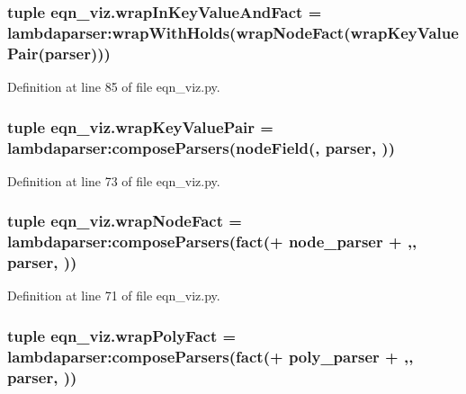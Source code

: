 \subsubsection[{wrap\+In\+Key\+Value\+And\+Fact}]{\setlength{\rightskip}{0pt plus 5cm}tuple eqn\+\_\+viz.\+wrap\+In\+Key\+Value\+And\+Fact = lambdaparser\+:wrap\+With\+Holds({\bf wrap\+Node\+Fact}({\bf wrap\+Key\+Value\+Pair}(parser)))}\label{namespaceeqn__viz_aff7c3fc95453270d356d2c9fef5be210}


Definition at line 85 of file eqn\+\_\+viz.\+py.

\hypertarget{namespaceeqn__viz_adf51f57cbfcd953ec98550b85dcc3d0c}{}
\subsubsection[{wrap\+Key\+Value\+Pair}]{\setlength{\rightskip}{0pt plus 5cm}tuple eqn\+\_\+viz.\+wrap\+Key\+Value\+Pair = lambdaparser\+:compose\+Parsers(\textquotesingle{}node\+Field(\textquotesingle{}, parser, \textquotesingle{})\textquotesingle{})}\label{namespaceeqn__viz_adf51f57cbfcd953ec98550b85dcc3d0c}


Definition at line 73 of file eqn\+\_\+viz.\+py.

\hypertarget{namespaceeqn__viz_a716255e5870a531e1bfc6d184278bc8d}{}
\subsubsection[{wrap\+Node\+Fact}]{\setlength{\rightskip}{0pt plus 5cm}tuple eqn\+\_\+viz.\+wrap\+Node\+Fact = lambdaparser\+:compose\+Parsers(\textquotesingle{}fact(\textquotesingle{}+ {\bf node\+\_\+parser} + \textquotesingle{},\textquotesingle{}, parser, \textquotesingle{})\textquotesingle{})}\label{namespaceeqn__viz_a716255e5870a531e1bfc6d184278bc8d}


Definition at line 71 of file eqn\+\_\+viz.\+py.

\hypertarget{namespaceeqn__viz_aa72fea76ddf1127d6dbcb77d7c76c63d}{}
\subsubsection[{wrap\+Poly\+Fact}]{\setlength{\rightskip}{0pt plus 5cm}tuple eqn\+\_\+viz.\+wrap\+Poly\+Fact = lambdaparser\+:compose\+Parsers(\textquotesingle{}fact(\textquotesingle{}+ {\bf poly\+\_\+parser} + \textquotesingle{},\textquotesingle{}, parser, \textquotesingle{})\textquotesingle{})}\label{namespaceeqn__viz_aa72fea76ddf1127d6dbcb77d7c76c63d}


